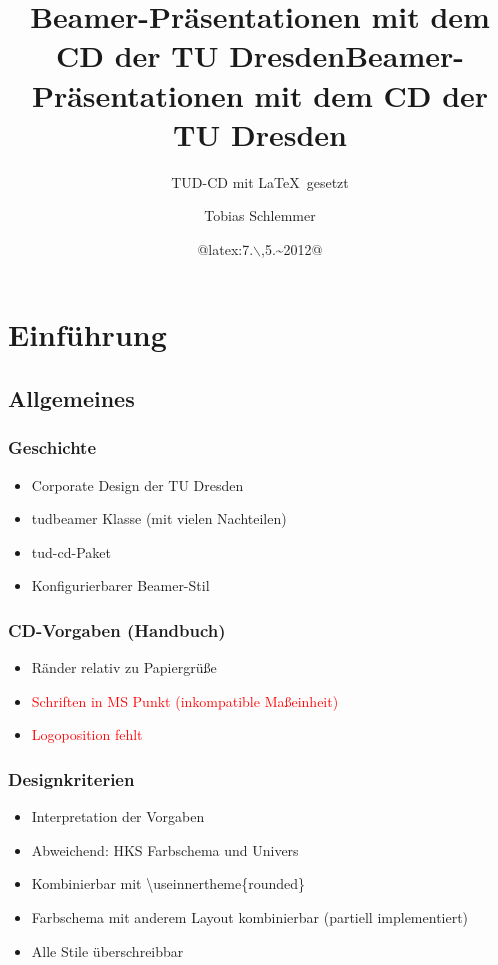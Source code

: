 \documentclass[presentation,t]{beamer}
\title[TUD-CD mit \LaTeX\ gesetzt]{Beamer-Präsentationen mit dem CD der TU Dresden}
\subtitle{TUD-CD mit \LaTeX\ gesetzt}
\author{Tobias Schlemmer}
\date{@latex:7.$\backslash$,5.\textasciitilde{}2012@}
\title{Beamer-Präsentationen mit dem CD der TU Dresden}
\begin{document}
\maketitle
\tableofcontents

\section{Einführung}
\label{sec:orgd03e7a0}
\subsection{Allgemeines}
\label{sec:orgec9a0d5}
\subsubsection{Geschichte}
\label{sec:org4e14fa7}
\begin{itemize}
\item Corporate Design der TU Dresden
\item tudbeamer Klasse (mit vielen Nachteilen)
\item tud-cd-Paket
\item \alert{Konfigurierbarer Beamer-Stil}
\end{itemize}
\subsubsection{CD-Vorgaben (Handbuch)}
\label{sec:org7875d76}
\begin{itemize}
\item \textcolor{HKS65K100}{Ränder relativ zu Papiergrüße}
\item \textcolor{red}{Schriften in MS Punkt (inkompatible Maßeinheit)}
\item \textcolor{red}{Logoposition fehlt}
\end{itemize}
\subsubsection{Designkriterien}
\label{sec:orgaa56e41}
\begin{itemize}
\item Interpretation der Vorgaben
\item Abweichend: HKS Farbschema und Univers
\item Kombinierbar mit \textbackslash useinnertheme\{rounded\}
\item Farbschema mit anderem Layout kombinierbar (partiell implementiert)
\item Alle Stile überschreibbar
\end{itemize}
\end{document}
